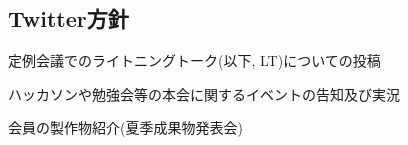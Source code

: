 \subsection*{Twitter方針}


定例会議でのライトニングトーク(以下, LT)についての投稿

ハッカソンや勉強会等の本会に関するイベントの告知及び実況

会員の製作物紹介(夏季成果物発表会) 



